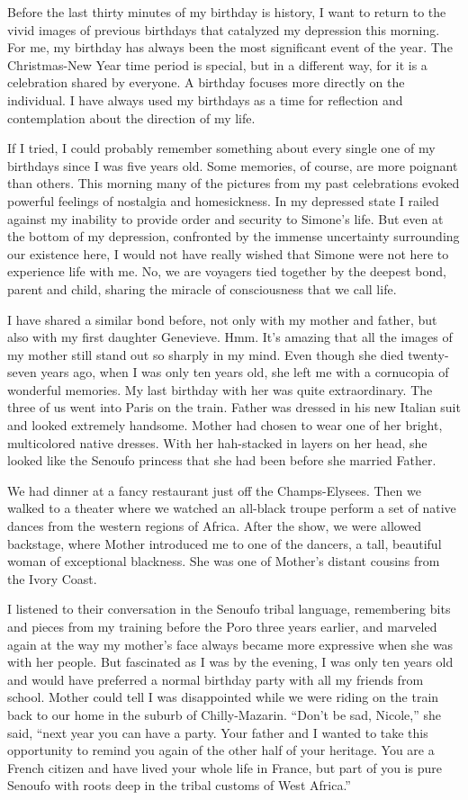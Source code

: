 \documentclass[]{article}
\begin{document}
Before the last thirty minutes of my birthday is history, I want to return to the vivid images of previous birthdays that catalyzed my depression this morning. For me, my birthday has always been the most significant event of the year. The Christmas-New Year time period is special, but in a different way, for it is a celebration shared by everyone. A birthday focuses more directly on the individual. I have always used my birthdays as a time for reflection and contemplation about the direction of my life.

If I tried, I could probably remember something about every single one of my birthdays since I was five years old. Some memories, of course, are more poignant than others. This morning many of the pictures from my past celebrations evoked powerful feelings of nostalgia and homesickness. In my depressed state I railed against my inability to provide order and security to Simone’s life. But even at the bottom of my depression, confronted by the immense uncertainty surrounding our existence here, I would not have really wished that Simone were not here to experience life with me. No, we are voyagers tied together by the deepest bond, parent and child, sharing the miracle of consciousness that we call life.

I have shared a similar bond before, not only with my mother and father, but also with my first daughter Genevieve. Hmm. It’s amazing that all the images of my mother still stand out so sharply in my mind. Even though she died twenty-seven years ago, when I was only ten years old, she left me with a cornucopia of wonderful memories. My last birthday with her was quite extraordinary. The three of us went into Paris on the train. Father was dressed in his new Italian suit and looked extremely handsome. Mother had chosen to wear one of her bright, multicolored native dresses. With her hah-stacked in layers on her head, she looked like the Senoufo princess that she had been before she married Father.

We had dinner at a fancy restaurant just off the Champs-Elysees. Then we walked to a theater where we watched an all-black troupe perform a set of native dances from the western regions of Africa. After the show, we were allowed backstage, where Mother introduced me to one of the dancers, a tall, beautiful woman of exceptional blackness. She was one of Mother’s distant cousins from the Ivory Coast.

I listened to their conversation in the Senoufo tribal language, remembering bits and pieces from my training before the Poro three years earlier, and marveled again at the way my mother’s face always became more expressive when she was with her people. But fascinated as I was by the evening, I was only ten years old and would have preferred a normal birthday party with all my friends from school. Mother could tell I was disappointed while we were riding on the train back to our home in the suburb of Chilly-Mazarin. “Don’t be sad, Nicole,” she said, “next year you can have a party. Your father and I wanted to take this opportunity to remind you again of the other half of your heritage. You are a French citizen and have lived your whole life in France, but part of you is pure Senoufo with roots deep in the tribal customs of West Africa.”
\end{document}
